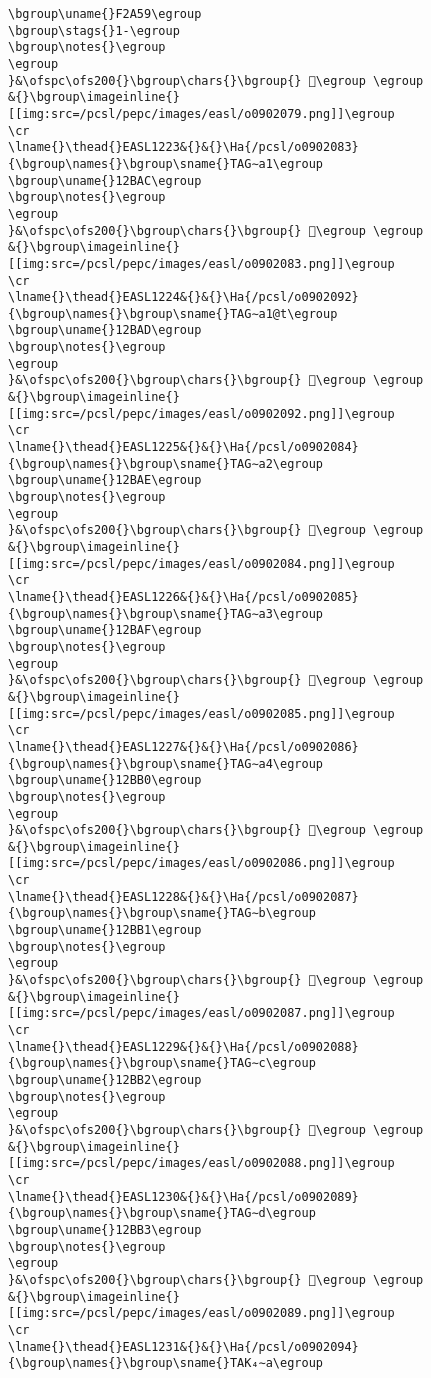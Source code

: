 \begin{verbatim}
\bgroup\uname{}F2A59\egroup
\bgroup\stags{}1-\egroup
\bgroup\notes{}\egroup
\egroup
}&\ofspc\ofs200{}\bgroup\chars{}\bgroup{} 󲩙\egroup \egroup
&{}\bgroup\imageinline{}[[img:src=/pcsl/pepc/images/easl/o0902079.png]]\egroup
\cr
\lname{}\thead{}EASL1223&{}&{}\Ha{/pcsl/o0902083}{\bgroup\names{}\bgroup\sname{}TAG∼a1\egroup
\bgroup\uname{}12BAC\egroup
\bgroup\notes{}\egroup
\egroup
}&\ofspc\ofs200{}\bgroup\chars{}\bgroup{} 𒮬\egroup \egroup
&{}\bgroup\imageinline{}[[img:src=/pcsl/pepc/images/easl/o0902083.png]]\egroup
\cr
\lname{}\thead{}EASL1224&{}&{}\Ha{/pcsl/o0902092}{\bgroup\names{}\bgroup\sname{}TAG∼a1@t\egroup
\bgroup\uname{}12BAD\egroup
\bgroup\notes{}\egroup
\egroup
}&\ofspc\ofs200{}\bgroup\chars{}\bgroup{} 𒮭\egroup \egroup
&{}\bgroup\imageinline{}[[img:src=/pcsl/pepc/images/easl/o0902092.png]]\egroup
\cr
\lname{}\thead{}EASL1225&{}&{}\Ha{/pcsl/o0902084}{\bgroup\names{}\bgroup\sname{}TAG∼a2\egroup
\bgroup\uname{}12BAE\egroup
\bgroup\notes{}\egroup
\egroup
}&\ofspc\ofs200{}\bgroup\chars{}\bgroup{} 𒮮\egroup \egroup
&{}\bgroup\imageinline{}[[img:src=/pcsl/pepc/images/easl/o0902084.png]]\egroup
\cr
\lname{}\thead{}EASL1226&{}&{}\Ha{/pcsl/o0902085}{\bgroup\names{}\bgroup\sname{}TAG∼a3\egroup
\bgroup\uname{}12BAF\egroup
\bgroup\notes{}\egroup
\egroup
}&\ofspc\ofs200{}\bgroup\chars{}\bgroup{} 𒮯\egroup \egroup
&{}\bgroup\imageinline{}[[img:src=/pcsl/pepc/images/easl/o0902085.png]]\egroup
\cr
\lname{}\thead{}EASL1227&{}&{}\Ha{/pcsl/o0902086}{\bgroup\names{}\bgroup\sname{}TAG∼a4\egroup
\bgroup\uname{}12BB0\egroup
\bgroup\notes{}\egroup
\egroup
}&\ofspc\ofs200{}\bgroup\chars{}\bgroup{} 𒮰\egroup \egroup
&{}\bgroup\imageinline{}[[img:src=/pcsl/pepc/images/easl/o0902086.png]]\egroup
\cr
\lname{}\thead{}EASL1228&{}&{}\Ha{/pcsl/o0902087}{\bgroup\names{}\bgroup\sname{}TAG∼b\egroup
\bgroup\uname{}12BB1\egroup
\bgroup\notes{}\egroup
\egroup
}&\ofspc\ofs200{}\bgroup\chars{}\bgroup{} 𒮱\egroup \egroup
&{}\bgroup\imageinline{}[[img:src=/pcsl/pepc/images/easl/o0902087.png]]\egroup
\cr
\lname{}\thead{}EASL1229&{}&{}\Ha{/pcsl/o0902088}{\bgroup\names{}\bgroup\sname{}TAG∼c\egroup
\bgroup\uname{}12BB2\egroup
\bgroup\notes{}\egroup
\egroup
}&\ofspc\ofs200{}\bgroup\chars{}\bgroup{} 𒮲\egroup \egroup
&{}\bgroup\imageinline{}[[img:src=/pcsl/pepc/images/easl/o0902088.png]]\egroup
\cr
\lname{}\thead{}EASL1230&{}&{}\Ha{/pcsl/o0902089}{\bgroup\names{}\bgroup\sname{}TAG∼d\egroup
\bgroup\uname{}12BB3\egroup
\bgroup\notes{}\egroup
\egroup
}&\ofspc\ofs200{}\bgroup\chars{}\bgroup{} 𒮳\egroup \egroup
&{}\bgroup\imageinline{}[[img:src=/pcsl/pepc/images/easl/o0902089.png]]\egroup
\cr
\lname{}\thead{}EASL1231&{}&{}\Ha{/pcsl/o0902094}{\bgroup\names{}\bgroup\sname{}TAK₄∼a\egroup

\end{verbatim}
